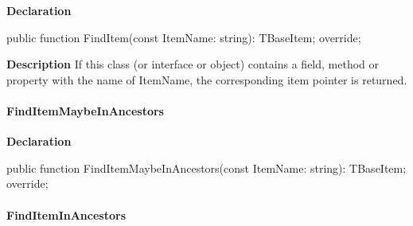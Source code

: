 \documentclass{report}
\newif\ifpdf
\begin{document}
\label{PasDoc_Items.TPasCio-FindItem}
\begin{list}{}{
\setlength{\itemindent}{0cm}
\setlength{\listparindent}{0cm}
\setlength{\leftmargin}{\evensidemargin}
\addtolength{\leftmargin}{\tmplength}
\settowidth{\labelsep}{X}
\addtolength{\leftmargin}{\labelsep}
\setlength{\labelwidth}{\tmplength}
}
\item[\textbf{Declaration}\hfill]
\ifpdf
\begin{flushleft}
\fi
\begin{ttfamily}
public function FindItem(const ItemName: string): TBaseItem; override;\end{ttfamily}

\ifpdf
\end{flushleft}
\fi

\par
\item[\textbf{Description}]
If this class (or interface or object) contains a field, method or property with the name of ItemName, the corresponding item pointer is returned.

\end{list}
\paragraph*{FindItemMaybeInAncestors}\hspace*{\fill}

\label{PasDoc_Items.TPasCio-FindItemMaybeInAncestors}
\begin{list}{}{
\setlength{\itemindent}{0cm}
\setlength{\listparindent}{0cm}
\setlength{\leftmargin}{\evensidemargin}
\addtolength{\leftmargin}{\tmplength}
\settowidth{\labelsep}{X}
\addtolength{\leftmargin}{\labelsep}
\setlength{\labelwidth}{\tmplength}
}
\item[\textbf{Declaration}\hfill]
\ifpdf
\begin{flushleft}
\fi
\begin{ttfamily}
public function FindItemMaybeInAncestors(const ItemName: string): TBaseItem; override;\end{ttfamily}

\ifpdf
\end{flushleft}
\fi

\end{list}
\paragraph*{FindItemInAncestors}\hspace*{\fill}
\end{document}
